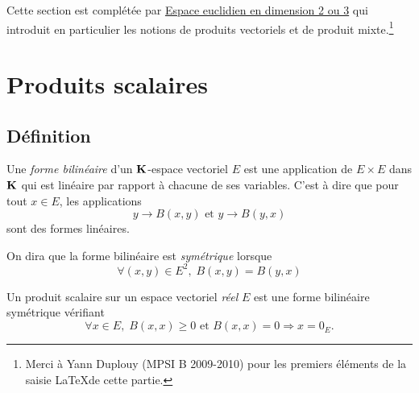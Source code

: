 

Cette section est complétée par \href{\baseurl C6172.pdf}{Espace euclidien en dimension 2 ou 3} qui introduit en particulier les notions de produits vectoriels et de produit mixte.\footnote{Merci à Yann Duplouy (MPSI B 2009-2010) pour les premiers éléments de la saisie \LaTeX de cette partie.}

\section{Produits scalaires}
\subsection{Définition}
\begin{defi}
Une \emph{forme bilinéaire} d'un $\mathbf{K}$-espace vectoriel $E$ est une application de $E\times E$ dans $\mathbf{K}$ qui est linéaire par rapport à chacune de ses variables. C'est à dire que pour tout $x\in E$, les applications
\begin{displaymath}
 y\rightarrow B(x,y) \text{ et } y\rightarrow B(y,x)
\end{displaymath}
sont des formes linéaires.
\end{defi}
\begin{defi}
On dira que la forme bilinéaire est \emph{symétrique} lorsque 
\begin{displaymath}
  \forall (x,y)\in E^2,\; B(x,y) = B(y,x)
\end{displaymath}
\end{defi}
\begin{defi}
Un produit scalaire sur un espace vectoriel \emph{réel} $E$ est une forme bilinéaire symétrique vérifiant
\begin{displaymath}
\forall x \in E, \; B(x,x) \geq 0 \text{ et } B(x,x) = 0 \Rightarrow x = 0_E .
\end{displaymath}
\end{defi}
